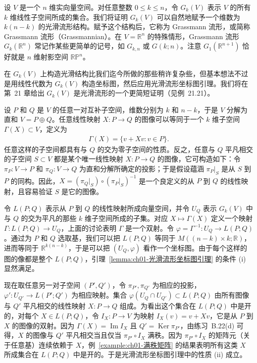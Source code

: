 \documentclass[../../main.tex]{subfiles}
\begin{document}
\begin{example}[Grassmann 流形]\label{example:ch01-Grassmann流形}
设 $V$ 是一个 $n$ 维实向量空间。对任意整数 $0\leqslant k\leqslant n$，令 $G_{k}(V)$ 表示 $V$ 的所有 $k$ 维线性子空间所成的集合。我们将证明 $G_{k}(V)$ 可以自然地赋予一个维数为 $k(n-k)$ 的光滑流形结构。赋予这个结构后，它称为 Grassmann 流形，或简称 Grassmann 流形（Grassmannian）。在 $V=\mathbb{R}^{n}$ 的特殊情形，Grassmann 流形 $G_{k}(\mathbb{R}^{n})$ 常记作某些更简单的记号，如 $G_{k,n}$ 或 $G(k;n)$。注意 $G_{1}(\mathbb{R}^{n+1})$ 恰好就是 $n$ 维射影空间 $\mathbb{RP}^{n}$。

在 $G_{k}(V)$ 上构造光滑结构比我们迄今所做的那些稍许复杂些，但基本想法不过是用线性代数为 $G_{k}(V)$ 构造坐标图，然后应用光滑流形坐标图引理。我们将在第~21 章给出 $G_{k}(V)$ 是光滑流形的一个更简短证明（见例~21.21）。

设 $P$ 和 $Q$ 是 $V$ 的任意一对互补子空间，维数分别为 $k$ 和 $n-k$，于是 $V$ 分解为直和 $V=P\oplus Q$。任意线性映射 $X:P\to Q$ 的图像可以等同于一个 $k$ 维子空间 $\Gamma(X)\subset V$，定义为
\begin{align*}
\Gamma(X)=\{v+Xv:v\in P\}.
\end{align*}
任意这样的子空间都具有与 $Q$ 的交为零子空间的性质。反之，任意与 $Q$ 平凡相交的子空间 $S\subset V$ 都是某个唯一线性映射 $X:P\to Q$ 的图像，它可构造如下：令 $\pi_{P}:V\to P$ 和 $\pi_{Q}:V\to Q$ 为直和分解所确定的投影；于是假设蕴涵 $\pi_{P}|_{S}$ 是从 $S$ 到 $P$ 的同构。因此，$X=(\pi_{Q}|_{S})\circ(\pi_{P}|_{S})^{-1}$ 是一个良定义的从 $P$ 到 $Q$ 的线性映射，且容易验证 $S$ 是它的图像。

令 $L(P;Q)$ 表示从 $P$ 到 $Q$ 的线性映射所成向量空间，并令 $U_{Q}$ 表示 $G_{k}(V)$ 中与 $Q$ 的交为平凡的那些 $k$ 维子空间所成的子集。对应 $X\mapsto\Gamma(X)$ 定义一个映射 $\Gamma:L(P;Q)\to U_{Q}$，上面的讨论表明 $\Gamma$ 是一个双射。令 $\varphi=\Gamma^{-1}:U_{Q}\to L(P;Q)$。通过为 $P$ 和 $Q$ 选取基，我们可以把 $L(P;Q)$ 等同于 $M((n-k)\times k;\mathbb{R})$，进而等同于 $\mathbb{R}^{k(n-k)}$，于是可以把 $(U_{Q},\varphi)$ 看作一个坐标图。由于每个这样的图的像都是整个 $L(P;Q)$，引理~\cref{lemma:ch01-光滑流形坐标图引理} 的条件 (i) 显然满足。

现在取任意另一对子空间 $(P',Q')$，令 $\pi_{P'},\pi_{Q'}$ 为相应的投影，$\varphi':U_{Q'}\to L(P';Q')$ 为相应映射。集合 $\varphi(U_{Q}\cap U_{Q'})\subset L(P;Q)$ 由所有图像与 $Q'$ 平凡相交的线性映射 $X:P\to Q$ 组成。为看出这个集合在 $L(P;Q)$ 中是开的，对每个 $X\in L(P;Q)$，令 $I_{X}:P\to V$ 为映射 $I_{X}(v)=v+Xv$，它是从 $P$ 到 $X$ 的图像的双射。因为 $\Gamma(X)=\operatorname{Im}I_{X}$ 且 $Q'=\operatorname{Ker}\pi_{P'}$，由练习~B.22(d) 可得，$X$ 的图像与 $Q'$ 平凡相交当且仅当 $\pi_{P'}\circ I_{X}$ 满秩。因为 $\pi_{P'}\circ I_{X}$ 的矩阵元（关于任意基）连续依赖于 $X$，例~\cref{example:ch01-满秩矩阵} 的结果表明所有这类 $X$ 所成集合在 $L(P;Q)$ 中是开的。于是光滑流形坐标图引理中的性质 (ii) 成立。


\end{example}
\end{document}
